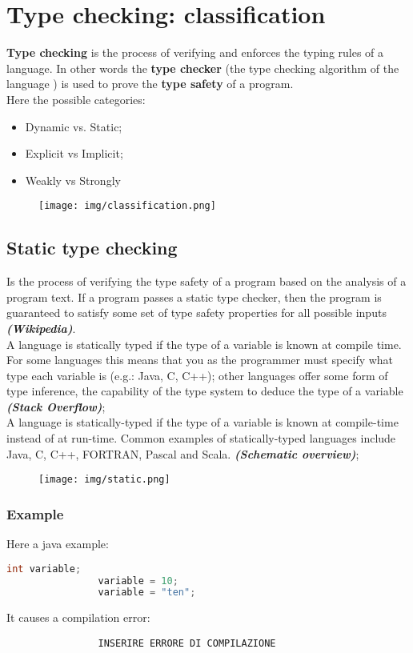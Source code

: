 \documentclass[12pt]{article}
\begin{document}
\section{Type checking: classification}
	\textbf{Type checking} is the process of verifying and enforces the typing rules of a language. In other words the \textbf{type checker} (the type checking algorithm of the language ) is used to prove the \textbf{type safety} of a program.\\
	Here the possible categories:
	\begin{itemize}
		\item Dynamic vs. Static;
		\item Explicit vs Implicit;
		\item Weakly vs Strongly
	\end{itemize}

	\begin{figure}[h!]
		\centering
		\texttt{[image: img/classification.png]}
	\end{figure}

	\subsection{Static type checking}
		Is the process of verifying the type safety of a program based on the analysis of a program text.  If a program passes a static type checker, then the program is guaranteed to satisfy some set of type safety properties for all possible inputs \textit{\textbf{(Wikipedia)}}.\\
		A language is statically typed if the type of a variable is known at compile time. For some languages this means that you as the programmer must specify what type each variable is (e.g.: Java, C, C++); other languages offer some form of type inference, the capability of the type system to deduce the type of a variable \textit{\textbf{(Stack Overflow)}};\\
		A language is statically-typed if the type of a variable is known at compile-time instead of at run-time. Common examples of statically-typed languages include Java, C, C++, FORTRAN, Pascal and Scala. \textbf{\textit{(Schematic overview)}};\\
		
		\begin{figure}[h!]
			\centering
			\texttt{[image: img/static.png]}
		\end{figure}
	
		\subsubsection{Example}	
			Here a java example: 
			\begin{lstlisting}[language=Java]
				int variable;
				variable = 10;
				variable = "ten";
			\end{lstlisting}
			It causes a compilation error:
			\begin{lstlisting}
				INSERIRE ERRORE DI COMPILAZIONE
			\end{lstlisting}
			
\end{document}
